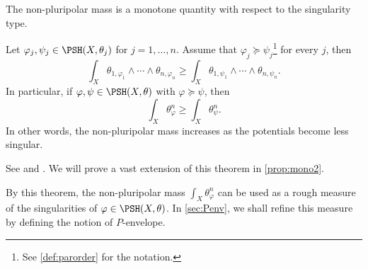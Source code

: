 The non-pluripolar mass is a monotone quantity with respect to the singularity type.
\begin{theorem}\label{thm:mono}
 Let $\varphi_j,\psi_j\in \PSH(X,\theta_j)$ for $j=1,\ldots,n$. Assume that $\varphi_j \succeq \psi_j$\footnote{See \cref{def:parorder} for the notation.} for every $j$, then
 \[
 \int_{X} \theta_{1,\varphi_1}\wedge \cdots \wedge \theta_{n,\varphi_n} \geq \int_{X}  \theta_{1,\psi_1}\wedge \cdots \wedge  \theta_{n,\psi_n}.
 \]
 In particular, if $\varphi,\psi\in \PSH(X,\theta)$ with $\varphi\succeq \psi$, then
 \[
 \int_X \theta_{\varphi}^n\geq  \int_X \theta_{\psi}^n.
 \]
 In other words, the non-pluripolar mass increases as the potentials become less singular.
\end{theorem}
See \cite[Theorem~1.1]{DDNL18mono} and \cite[Theorem~15.7.4 and Corollary~15.7.5]{FPT}. We will prove a vast extension of this theorem in \cref{prop:mono2}.

By this theorem, the non-pluripolar mass $\int_X \theta_{\varphi}^n$ can be used as a rough measure of the singularities of $\varphi\in \PSH(X,\theta)$. In \cref{sec:Penv}, we shall refine this measure by defining the notion of $P$-envelope.

